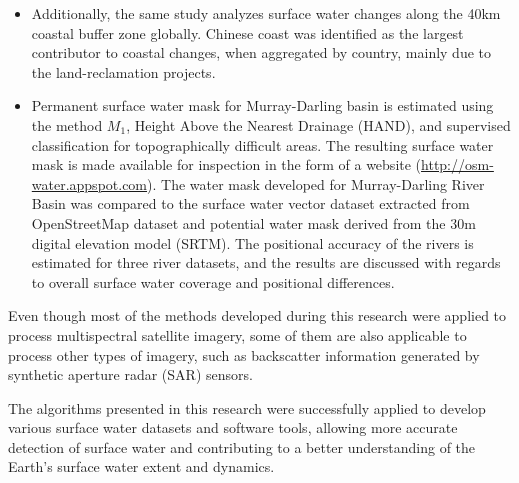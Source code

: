 \begin{itemize}
	\item Additionally, the same study analyzes surface water changes along the 40km coastal buffer zone globally. Chinese coast was identified as the largest contributor to coastal changes, when aggregated by country, mainly due to the land-reclamation projects.
	
	\begin{comment}
	\item The first 30m, nearly-global HAND dataset was developed, derived from NASA/USGS Shuttle Radar Topography Mission (SRTM) digital elevation model and HydroBASINS dataset (\url{http://global-hand.appspot.com}). A homogenized, equal-size version of HydroBASINS dataset was generated to support parallel delineation of the drainage network, drainage directions and flow accumulation to generate global HAND dataset. We discuss the applicability of HAND and other hydrological datasets as auxiliary data to improve surface water detection in topographically challenging areas. We discuss the value of HAND dataset to identify errors in SRTM and its use for water classification in topographically complex areas. 
	\end{comment}
	
	\item Permanent surface water mask for Murray-Darling basin is estimated using the method $M_1$, Height Above the Nearest Drainage (HAND), and supervised classification for topographically difficult areas. The resulting surface water mask is made available for inspection in the form of a website (\url{http://osm-water.appspot.com}). The water mask developed for Murray-Darling River Basin was compared to the surface water vector dataset extracted from OpenStreetMap dataset and potential water mask derived from the 30m digital elevation model (SRTM). The positional accuracy of the rivers is estimated for three river datasets, and the results are discussed with regards to overall surface water coverage and positional differences.    
\end{itemize}

Even though most of the methods developed during this research were applied to process multispectral satellite imagery, some of them are also applicable to process other types of imagery, such as backscatter information generated by synthetic aperture radar (SAR) sensors.

The algorithms presented in this research were successfully applied to develop various surface water datasets and software tools, allowing more accurate detection of surface water and contributing to a better understanding of the Earth's surface water extent and dynamics.

